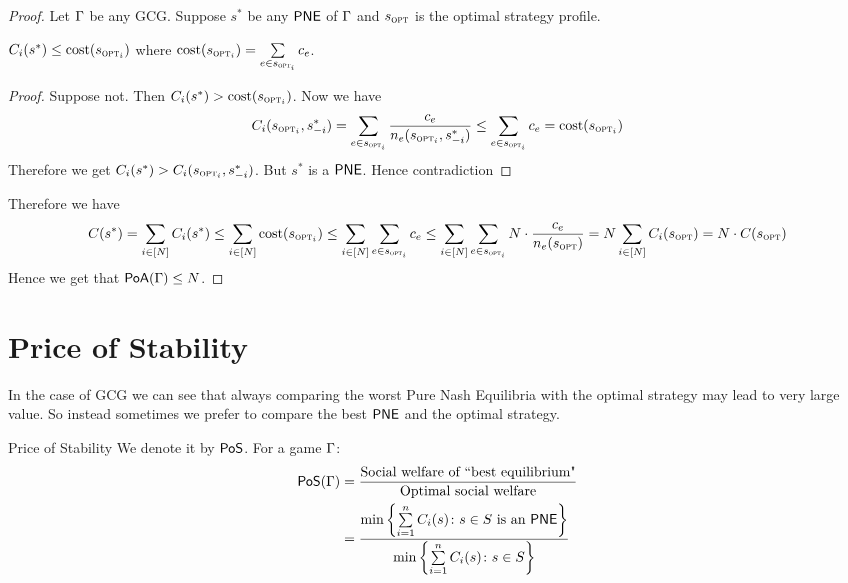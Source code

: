 \begin{proof}
Let $\Gamma$ be any GCG. Suppose $s^*$ be any $\operatorname{\mathsf{PNE}}$ of $\Gamma$ and $s_{\textsc{opt}}$ is the optimal strategy profile. \begin{claimwidth}
	\begin{claim}{}{}
		$C_i(s^*)\leq \text{cost}(s_{\textsc{opt}_i})$ where $\text{cost}(s_{\textsc{opt}_i})=\sum\limits_{e\in s_{\textsc{opt}_i}}c_e$.
	\end{claim}
\begin{proof}
	Suppose not. Then 	$C_i(s^*)> \text{cost}(s_{\textsc{opt}_i})$. Now we have $$C_i(s_{\textsc{opt}_i},s^*_{-i})=\sum\limits_{e\in s_{\textsc{opt}_i}}\frac{c_e}{n_e(s_{\textsc{opt}_i},s^*_{-i})}\leq  \sum\limits_{e\in s_{\textsc{opt}_i}}{c_e}=\text{cost}(s_{\textsc{opt}_i})$$Therefore we get $C_i(s^*)>C_i(s_{\textsc{opt}_i},s^*_{-i})$.   But $s^*$ is a $\operatorname{\mathsf{PNE}}$. Hence contradiction \ctr 
\end{proof}
\end{claimwidth}

Therefore we have $$C(s^*)=\sum\limits_{i\in[N]}C_i(s^*)\leq \sum\limits_{i\in[N]} \text{cost}(s_{\textsc{opt}_i})\leq \sum\limits_{i\in[N]}\sum\limits_{e\in s_{\textsc{opt}_i}}c_e\leq \sum\limits_{i\in[N]}\sum\limits_{e\in s_{\textsc{opt}_i}}N\cdot\frac{c_e}{n_e(s_{\textsc{opt}})}=N\sum\limits_{i\in[N]}C_i(s_{\textsc{opt}})=N\cdot C(s_{\textsc{opt}}) $$Hence we get that $\operatorname{\mathsf{PoA}}(\Gamma)\leq N$.
\end{proof}

\section{Price of Stability}
In the case of GCG we can see that always comparing the worst Pure Nash Equilibria with the optimal strategy may lead to very large value. So instead sometimes we prefer to compare the best $\operatorname{\mathsf{PNE}}$ and the optimal strategy.
\begin{definition}{Price of Stability}{}
	We denote it by $\operatorname{\mathsf{PoS}}$. For a game $\Gamma$:\begin{align*}
		\operatorname{\mathsf{PoS}}(\Gamma)& =\frac{\text{Social welfare of ``best equilibrium"}}{\text{Optimal social welfare}}\\
		&= \frac{\min\left\{\sum\limits_{i=1}^n C_i(s)\colon s\in S\text{ is an $\operatorname{\mathsf{PNE}}$}\right\}}{\min\left\{\sum\limits_{i=1}^n C_i(s)\colon s\in S\right\}}
	\end{align*}
\end{definition}

